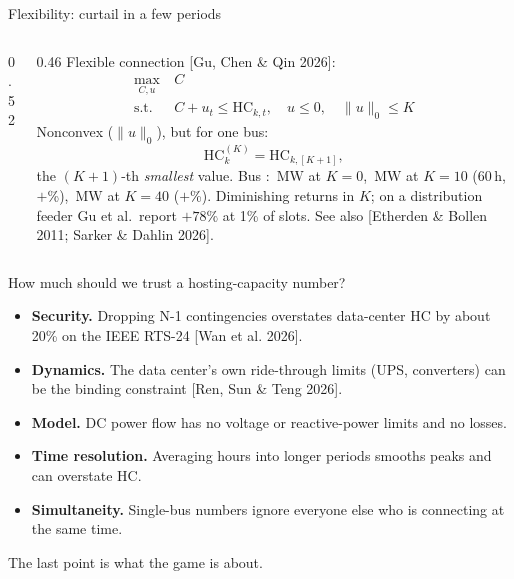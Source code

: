 \documentclass[aspectratio=169,11pt]{beamer}
\newcommand{\HC}{\ensuremath{\mathrm{HC}}}
\newcommand{\MW}{\ensuremath{\,\mathrm{MW}}}
\newcommand{\src}[1]{{\scriptsize\color{PurdueSteel}[#1]}}
\begin{document}
\begin{frame}{Flexibility: curtail in a few periods}
  \begin{columns}[T,onlytextwidth]
    \begin{column}{0.52\textwidth}
    \end{column}
    \begin{column}{0.46\textwidth}
      \small
      Flexible connection \src{Gu, Chen \& Qin 2026}:
      \[
        \begin{aligned}
          \max_{C,u}\ & C\\
          \text{s.t.}\ & C + u_t \le \HC_{k,t},\quad u\le 0,\quad \|u\|_0 \le K
        \end{aligned}
      \]
      Nonconvex ($\|u\|_0$), but for one bus:
      \[
        \HC_k^{(K)} = \HC_{k,[K+1]},
      \]
      the $(K{+}1)$-th \emph{smallest} value. Bus \OrdBus: \OrdZero\MW{} at $K=0$,
      \OrdTen\MW{} at $K=10$ (60\,h, $+$\OrdTenGain\%), \OrdForty\MW{} at
      $K=40$ ($+$\OrdFortyGain\%). Diminishing returns in $K$; on a
      distribution feeder Gu et al.\ report $+78\%$ at 1\% of slots.
      See also \src{Etherden \& Bollen 2011; Sarker \& Dahlin 2026}.
    \end{column}
  \end{columns}
\end{frame}

\begin{frame}{How much should we trust a hosting-capacity number?}
  \begin{itemize}
    \item \textbf{Security.} Dropping N-1 contingencies overstates data-center HC
      by about 20\% on the IEEE RTS-24 \src{Wan et al. 2026}.
    \item \textbf{Dynamics.} The data center's own ride-through limits (UPS,
      converters) can be the binding constraint \src{Ren, Sun \& Teng 2026}.
    \item \textbf{Model.} DC power flow has no voltage or reactive-power limits
      and no losses.
    \item \textbf{Time resolution.} Averaging hours into longer periods smooths
      peaks and can overstate HC.
    \item \textbf{Simultaneity.} Single-bus numbers ignore everyone else who is
      connecting at the same time.
  \end{itemize}
  \vspace{0.3em}
  The last point is what the game is about.
\end{frame}
\end{document}
